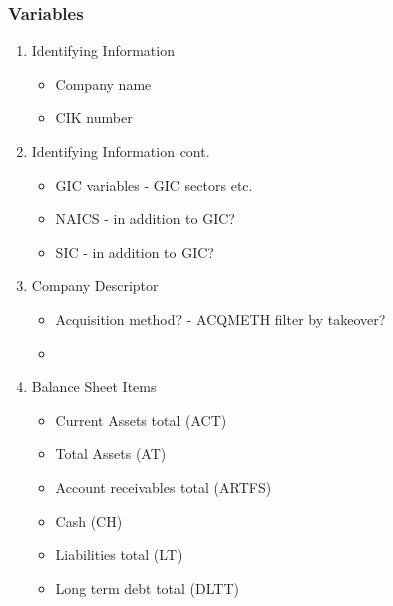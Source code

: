 \documentclass[12pt]{article}
\begin{document}
        \subsubsection{Variables}

    \begin{enumerate}
        \item Identifying Information

            \begin{itemize}
                \item Company name 
                \item CIK number 
            \end{itemize}
    
        \item Identifying Information cont.  
        
            \begin{itemize}
                \item GIC variables - GIC sectors etc.
                \item NAICS - in addition to GIC? 
                \item SIC - in addition to GIC?
            \end{itemize}

        \item Company Descriptor

            \begin{itemize}
                \item Acquisition method? - ACQMETH filter by takeover? 
                \item 
            \end{itemize}
        
        \item Balance Sheet Items 

            \begin{itemize}
                \item Current Assets total (ACT)
                \item Total Assets (AT)
                \item Account receivables total (ARTFS)
                \item Cash (CH)
                \item Liabilities total (LT) 
                \item Long term debt total (DLTT)
            \end{itemize}
        
    \end{enumerate}
\end{document}
